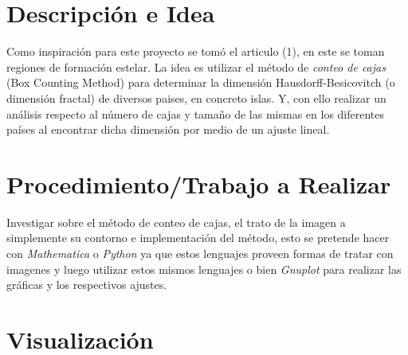 \vspace{0.5cm}

\section*{Descripción e Idea}

\noindent Como inspiración para este proyecto se tomó el articulo (1), en este se toman regiones de formación estelar. La idea es utilizar el método de \textit{conteo de cajas} (Box Counting Method) para determinar la dimensión Hausdorff-Besicovitch (o dimensión fractal) de diversos paises, en concreto islas.  Y, con ello realizar un análisis respecto al número de cajas y tamaño de las mismas en los diferentes países al encontrar dicha dimensión por medio de un ajuste lineal.



\section*{Procedimiento/Trabajo a Realizar}

\noindent Investigar sobre el método de conteo de cajas, el trato de la imagen a simplemente su contorno e implementación del método, esto se pretende hacer con \textit{Mathematica} o \textit{Python} ya que estos lenguajes proveen formas de tratar con imagenes y luego utilizar estos mismos lenguajes o bien \textit{Gnuplot} para realizar las gráficas y los respectivos ajustes.





\section*{Visualización}



